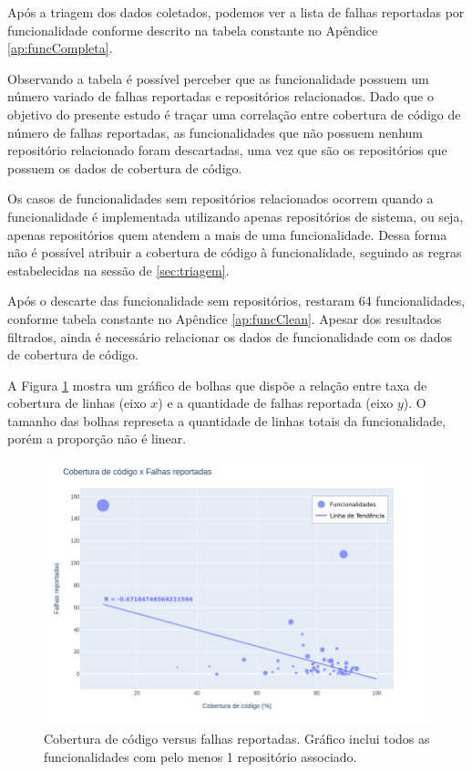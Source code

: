 \documentclass[11.5pt]{article}
\begin{document}
Após a triagem dos dados coletados, podemos ver a lista de falhas reportadas por funcionalidade
conforme descrito na tabela constante no Apêndice \ref{ap:funcCompleta}.

Observando a tabela é possível perceber que as funcionalidade possuem um número variado de falhas
reportadas e repositórios relacionados.
Dado que o objetivo do presente estudo é traçar uma correlação entre cobertura de código de número
de falhas reportadas, as funcionalidades que não possuem nenhum repositório relacionado foram
descartadas, uma vez que são os repositórios que possuem os dados de cobertura de código.

Os casos de funcionalidades sem repositórios relacionados ocorrem quando a funcionalidade é
implementada utilizando apenas repositórios de sistema, ou seja, apenas repositórios quem atendem a
mais de uma funcionalidade.
Dessa forma não é possível atribuir a cobertura de código à funcionalidade, seguindo as regras
estabelecidas na sessão de \ref{sec:triagem}.

Após o descarte das funcionalidade sem repositórios, restaram 64 funcionalidades, conforme
tabela constante no Apêndice \ref{ap:funcClean}.
Apesar dos resultados filtrados, ainda é necessário relacionar os dados de funcionalidade com os
dados de cobertura de código.

A Figura \ref{fig:cc_bugs_geral} mostra um gráfico de bolhas que dispõe a relação entre taxa de
cobertura de linhas (eixo $x$) e a quantidade de falhas reportada (eixo $y$).
O tamanho das bolhas represeta a quantidade de linhas totais da funcionalidade, porém a proporção
não é linear.

\begin{figure}[ht]
    \centering
    \includegraphics[width=1.0\textwidth]{cc_bugs_geral.png}
    \caption{Cobertura de código versus falhas reportadas. Gráfico inclui todos as funcionalidades
com pelo menos 1 repositório associado.}
    \label{fig:cc_bugs_geral}
\end{figure}
\end{document}
